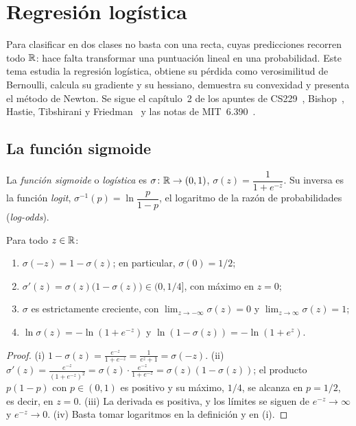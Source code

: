 \chapter{Regresión logística}
\label{tema:3}

Para clasificar en dos clases no basta con una recta, cuyas predicciones recorren todo $\mathbb{R}$: hace falta transformar una puntuación lineal en una probabilidad. Este tema estudia la regresión logística, obtiene su pérdida como verosimilitud de Bernoulli, calcula su gradiente y su hessiano, demuestra su convexidad y presenta el método de Newton. Se sigue el capítulo~2 de los apuntes de CS229~\cite[§2.1 y §2.4]{cs229}, Bishop~\cite[§4.3.2--4.3.3]{bishop}, Hastie, Tibshirani y Friedman~\cite[§4.4.1]{esl} y las notas de MIT~6.390~\cite[§4.3--4.4]{mit6390}.

\section{La función sigmoide}

\begin{definicion}\label{def:sigmoide}
La \emph{función sigmoide} o \emph{logística} es $\sigma\colon\mathbb{R}\to(0,1)$, $\sigma(z)=\dfrac{1}{1+e^{-z}}$. Su inversa es la función \emph{logit}, $\sigma^{-1}(p)=\ln\dfrac{p}{1-p}$, el logaritmo de la razón de probabilidades (\emph{log-odds}).
\end{definicion}

\begin{proposicion}\label{prop:sigmoide}
Para todo $z\in\mathbb{R}$:
\begin{enumerate}
  \item $\sigma(-z)=1-\sigma(z)$; en particular, $\sigma(0)=1/2$;
  \item $\sigma'(z)=\sigma(z)\bigl(1-\sigma(z)\bigr)\in(0,1/4]$, con máximo en $z=0$;
  \item $\sigma$ es estrictamente creciente, con $\lim_{z\to-\infty}\sigma(z)=0$ y $\lim_{z\to\infty}\sigma(z)=1$;
  \item $\ln\sigma(z)=-\ln(1+e^{-z})$ y $\ln(1-\sigma(z))=-\ln(1+e^{z})$.
\end{enumerate}
\end{proposicion}

\begin{proof}
(i) $1-\sigma(z)=\frac{e^{-z}}{1+e^{-z}}=\frac{1}{e^{z}+1}=\sigma(-z)$. (ii) $\sigma'(z)=\frac{e^{-z}}{(1+e^{-z})^{2}}=\sigma(z)\cdot\frac{e^{-z}}{1+e^{-z}}=\sigma(z)(1-\sigma(z))$; el producto $p(1-p)$ con $p\in(0,1)$ es positivo y su máximo, $1/4$, se alcanza en $p=1/2$, es decir, en $z=0$. (iii) La derivada es positiva, y los límites se siguen de $e^{-z}\to\infty$ y $e^{-z}\to 0$. (iv) Basta tomar logaritmos en la definición y en (i).
\end{proof}

